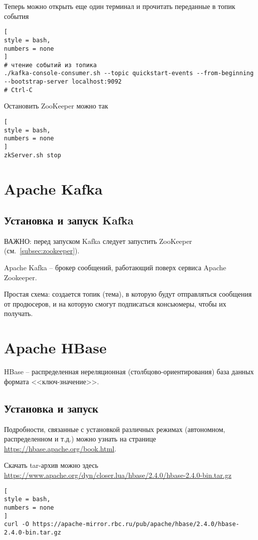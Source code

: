 \documentclass[%
	11pt,
	a4paper,
	utf8,
		]{article}
\begin{document}
Теперь можно открыть еще один терминал и прочитать переданные в топик события
\begin{lstlisting}[
style = bash,
numbers = none
]
# чтение событий из топика
./kafka-console-consumer.sh --topic quickstart-events --from-beginning --bootstrap-server localhost:9092
# Ctrl-C
\end{lstlisting}

Остановить ZooKeeper можно так
\begin{lstlisting}[
style = bash,
numbers = none	
]
zkServer.sh stop
\end{lstlisting}




\section{Apache Kafka}

\subsection{Установка и запуск Kafka}

ВАЖНО: перед запуском Kafka следует запустить ZooKeeper (см.~\ref{subsec:zookeeper}).

Apache Kafka -- брокер сообщений, работающий поверх сервиса Apache Zookeeper.

Простая схема: создается топик (тема), в которую будут отправляться сообщения от продюсеров, и на которую смогут подписаться консьюмеры, чтобы их получать.

\section{Apache HBase}

HBase -- распределенная нереляционная (столбцово-ориентирования) база данных формата <<ключ-значение>>. 

\subsection{Установка и запуск}

Подробности, связанные с установкой различных режимах (автономном, распределенном и т.д.) можно узнать на странице \url{https://hbase.apache.org/book.html}.

Скачать tar-архив можно здесь \url{https://www.apache.org/dyn/closer.lua/hbase/2.4.0/hbase-2.4.0-bin.tar.gz}
\begin{lstlisting}[
style = bash,
numbers = none	
]
curl -O https://apache-mirror.rbc.ru/pub/apache/hbase/2.4.0/hbase-2.4.0-bin.tar.gz
\end{lstlisting}
\end{document}
